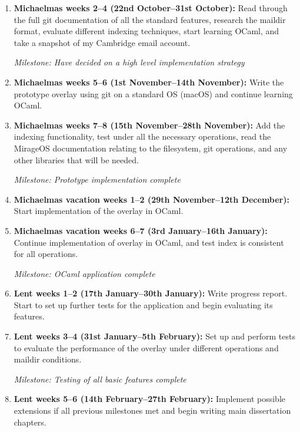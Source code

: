 \documentclass[12pt,a4paper,twoside]{article}
\begin{document}
\begin{enumerate}

    \item \textbf{Michaelmas weeks 2--4 (22nd October--31st October):} Read through the full git documentation of all the standard features, research the maildir format, evaluate different indexing techniques, start learning OCaml, and take a snapshot of my Cambridge email account.

        \emph{Milestone: Have decided on a high level implementation strategy}

    \item \textbf{Michaelmas weeks 5--6 (1st November--14th November):} Write the prototype overlay using git on a standard OS (macOS) and continue learning OCaml.

    \item \textbf{Michaelmas weeks 7--8 (15th November--28th November):} Add the indexing functionality, test under all the necessary operations, read the MirageOS documentation relating to the filesystem, git operations, and any other libraries that will be needed.

        \emph{Milestone: Prototype implementation complete}

    \item \textbf{Michaelmas vacation weeks 1--2 (29th November--12th December):} Start implementation of the overlay in OCaml.

    \item \textbf{Michaelmas vacation weeks 6--7 (3rd January--16th January):} Continue implementation of overlay in OCaml, and test index is consistent for all operations.

        \emph{Milestone: OCaml application complete}

    \item \textbf{Lent weeks 1--2 (17th January--30th January):} Write progress report. Start to set up further tests for the application and begin evaluating its features.

    \item \textbf{Lent weeks 3--4 (31st January--5th February):} Set up and perform tests to evaluate the performance of the overlay under different operations and maildir conditions.

        \emph{Milestone: Testing of all basic features complete}

    \item \textbf{Lent weeks 5--6 (14th February--27th February):} Implement possible extensions if all previous milestones met and begin writing main dissertation chapters.


\end{enumerate}
\end{document}
